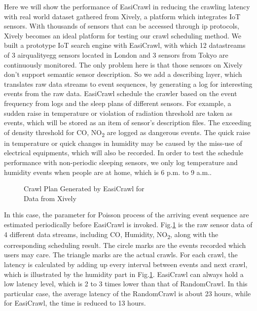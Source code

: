 \documentclass[conference]{IEEEtran}
\begin{document}
Here we will show the performance of EasiCrawl in reducing the crawling latency with real world dataset gathered from Xively, a platform which integrates IoT sensors.
With thousands of sensors that can be accessed through ip protocols, Xively becomes an ideal platform for testing our crawl scheduling method.
We built a prototype IoT search engine with EasiCrawl, with which 12 datastreams of 3 airqualityegg\cite{airegg} sensors located in London and 3 sensors from Tokyo are continuously monitored. 
The only problem here is that those sensors on Xively don't support semantic sensor description. 
So we add a describing layer, which translates raw data streams to event sequences, by generating a log for interesting events from the raw data.
EasiCrawl schedule the crawler based on the event frequency from logs and the sleep plans of different sensors.
For example, a sudden raise in temperature or violation of radiation threshold are taken as events, which will be stored as an item of sensor's description files.
The exceeding of density threshold for CO, NO\textsubscript{2} are logged as dangerous events.
The quick raise in temperature or quick changes in humidity may be caused by the miss-use of electrical equipments, which will also be recorded.
In order to test the schedule performance with non-periodic sleeping sensors, we only log temperature and humidity events when people are at home, which is 6 p.m. to 9 a.m..

\begin{figure}
	\centering
	\hspace{-1.0em}
	
	\captionsetup{justification=centering}
	\caption{Crawl Plan Generated by EasiCrawl for \\
		Data from Xively}
	\vspace{-1.5em}
	\label{fig:xivelycasestudy}
\end{figure}

In this case, the parameter for Poisson process of the arriving event sequence are estimated periodically before EasiCrawl is invoked.
Fig.\ref{fig:xivelycasestudy} is the raw sensor data of 4 different data streams, including CO, Humidity, NO\textsubscript{2}, along with the corresponding scheduling result. 
The circle marks are the events recorded which users may care. 
The triangle marks are the actual crawls. 
For each crawl, the latency is calculated by adding up every interval between events and next crawl, which is illustrated by the humidity part in Fig.\ref{fig:xivelycasestudy}.
EasiCrawl can always hold a low latency level, which is 2 to 3 times lower than that of RandomCrawl.
In this particular case, the average latency of the RandomCrawl is about 23 hours, while for EasiCrawl, the time is reduced to 13 hours. 
\end{document}
